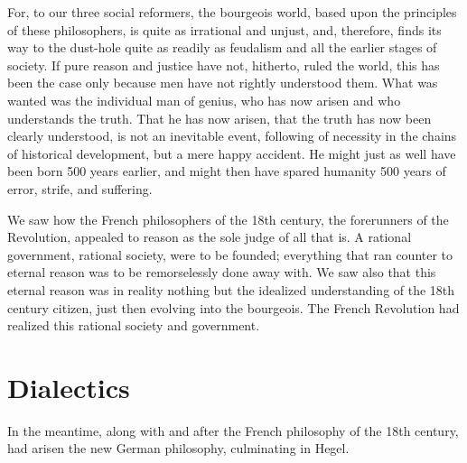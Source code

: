 \documentclass[oneside, 12pt]{book}
\begin{document}
For, to our three social reformers, the bourgeois world, based upon the
principles of these philosophers, is quite as irrational and unjust, and,
therefore, finds its way to the dust-hole quite as readily as feudalism and all
the earlier stages of society. If pure reason and justice have not, hitherto,
ruled the world, this has been the case only because men have not rightly
understood them. What was wanted was the individual man of genius, who has now
arisen and who understands the truth. That he has now arisen, that the truth has
now been clearly understood, is not an inevitable event, following of necessity
in the chains of historical development, but a mere happy accident. He might
just as well have been born 500 years earlier, and might then have spared
humanity 500 years of error, strife, and suffering.

We saw how the French philosophers of the 18th century, the forerunners of the
Revolution, appealed to reason as the sole judge of all that is. A rational
government, rational society, were to be founded; everything that ran counter to
eternal reason was to be remorselessly done away with. We saw also that this
eternal reason was in reality nothing but the idealized understanding of the
18th century citizen, just then evolving into the bourgeois. The French
Revolution had realized this rational society and government. 

\printendnotes


\chapter{Dialectics}

In the meantime, along with and after the French philosophy of the 18th century,
had arisen the new German philosophy, culminating in Hegel.
\end{document}
